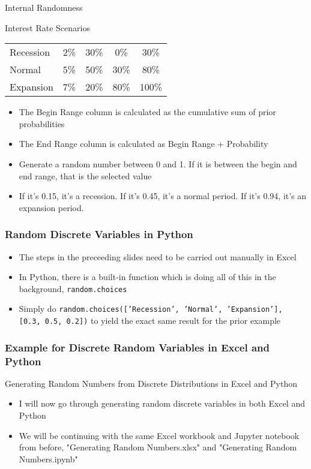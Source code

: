 \documentclass[handout, 11pt]{beamer}
\begin{document}
\begin{section}{Internal Randomness}
\begin{frame}
\begin{block}{Interest Rate Scenarios}
\begin{center}
\begin{tabular}{L{2cm}|cccc}
\midrule
Recession & 2\% & 30\% & 0\% & 30\%\\
Normal & 5\% & 50\% & 30\% & 80\%\\
Expansion & 7\% & 20\% & 80\% & 100\%\\

\end{tabular}
\end{center}
\end{block}
\begin{itemize}
\footnotesize
\item The Begin Range column is calculated as the cumulative sum of prior probabilities
\vfill
\item The End Range column is calculated as Begin Range + Probability
\vfill
\item Generate a random number between 0 and 1. If it is between the begin and end range, that is the selected value
\vfill
\item If it's 0.15, it's a recession. If it's 0.45, it's a normal period. If it's 0.94, it's an expansion period.
\end{itemize}
\end{frame}
\begin{frame}
\frametitle{Random Discrete Variables in Python}
\begin{itemize}
\item The steps in the preceeding slides need to be carried out manually in Excel
\vfill
\item In Python, there is a built-in function which is doing all of this in the background,
\texttt{random.choices}
\vfill
\item Simply do
\texttt{random.choices(['Recession', 'Normal', 'Expansion'], [0.3, 0.5, 0.2])}
to yield the exact same result for the prior example
\end{itemize}
\end{frame}
\begin{frame}
\frametitle{Example for Discrete Random Variables in Excel and Python}
{
\begin{block}{Generating Random Numbers from Discrete Distributions in Excel and Python}
\begin{itemize}
\item I will now go through generating random discrete variables in both Excel and Python
\item We will be continuing with the same Excel workbook and Jupyter notebook from before, "Generating Random Numbers.xlsx" and "Generating Random Numbers.ipynb"

\end{itemize}
\end{block}}
\end{frame}
\end{section}
\end{document}
